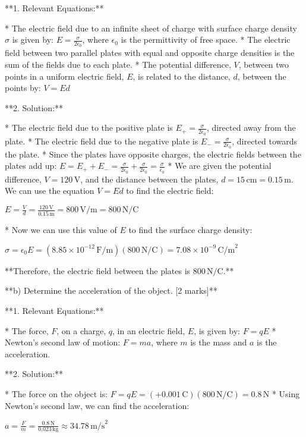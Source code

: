 \documentclass{article}
\begin{document}
**1. Relevant Equations:**

*   The electric field due to an infinite sheet of charge with surface charge density $\sigma$ is given by:  $E = \frac{\sigma}{2\epsilon_0}$, where $\epsilon_0$ is the permittivity of free space.
*   The electric field between two parallel plates with equal and opposite charge densities is the sum of the fields due to each plate.
*   The potential difference, $V$, between two points in a uniform electric field, $E$, is related to the distance, $d$, between the points by: $V = Ed$

**2. Solution:**

*   The electric field due to the positive plate is $E_+ = \frac{\sigma}{2\epsilon_0}$, directed away from the plate.
*   The electric field due to the negative plate is $E_- = \frac{\sigma}{2\epsilon_0}$, directed towards the plate.
*   Since the plates have opposite charges, the electric fields between the plates add up: $E = E_+ + E_- = \frac{\sigma}{2\epsilon_0} + \frac{\sigma}{2\epsilon_0} = \frac{\sigma}{\epsilon_0}$
*   We are given the potential difference, $V = 120 \, \text{V}$, and the distance between the plates, $d = 15 \, \text{cm} = 0.15 \, \text{m}$.  We can use the equation $V=Ed$ to find the electric field:

$E = \frac{V}{d} = \frac{120 \, \text{V}}{0.15 \, \text{m}} = 800 \, \text{V/m} = 800 \, \text{N/C}$

*   Now we can use this value of $E$ to find the surface charge density:

$\sigma = \epsilon_0 E = (8.85 \times 10^{-12} \, \text{F/m})(800 \, \text{N/C}) = 7.08 \times 10^{-9} \, \text{C/m}^2$

**Therefore, the electric field between the plates is $800 \, \text{N/C}$.**

**b) Determine the acceleration of the object. [2 marks]**

**1. Relevant Equations:**

*   The force, $F$, on a charge, $q$, in an electric field, $E$, is given by: $F=qE$
*   Newton's second law of motion: $F=ma$, where $m$ is the mass and $a$ is the acceleration.

**2. Solution:**

*   The force on the object is: $F = qE = (+0.001 \, \text{C})(800 \, \text{N/C}) = 0.8 \, \text{N}$
*   Using Newton's second law, we can find the acceleration:

$a = \frac{F}{m} = \frac{0.8 \, \text{N}}{0.023 \, \text{kg}} \approx 34.78 \, \text{m/s}^2$
\end{document}
